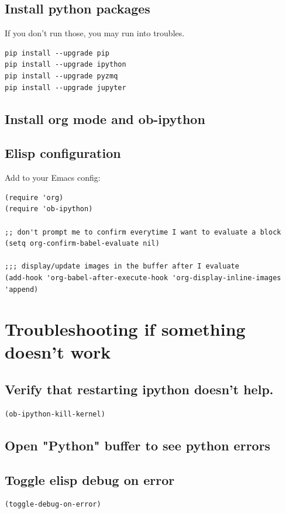 \documentclass[11pt]{article}
\begin{document}
\subsection{Install python packages}
\label{sec:orgheadline30}
If you don't run those, you may run into troubles.
\begin{verbatim}
pip install --upgrade pip
pip install --upgrade ipython
pip install --upgrade pyzmq
pip install --upgrade jupyter
\end{verbatim}
\subsection{Install org mode and ob-ipython}
\label{sec:orgheadline31}
\subsection{Elisp configuration}
\label{sec:orgheadline32}
Add to your Emacs config:
\begin{verbatim}
(require 'org)
(require 'ob-ipython)

;; don't prompt me to confirm everytime I want to evaluate a block
(setq org-confirm-babel-evaluate nil)

;;; display/update images in the buffer after I evaluate
(add-hook 'org-babel-after-execute-hook 'org-display-inline-images 'append)
\end{verbatim}
\section{Troubleshooting if something doesn't work}
\label{sec:orgheadline38}
\subsection{Verify that restarting ipython doesn't help.}
\label{sec:orgheadline34}
\begin{verbatim}
(ob-ipython-kill-kernel)
\end{verbatim}
\subsection{Open "Python" buffer to see python errors}
\label{sec:orgheadline35}
\subsection{Toggle elisp debug on error}
\label{sec:orgheadline36}
\begin{verbatim}
(toggle-debug-on-error)
\end{verbatim}
\end{document}
